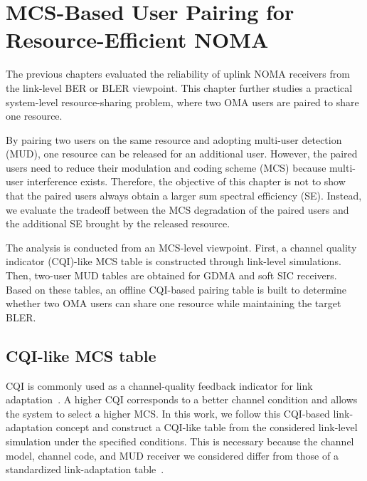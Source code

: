 
\chapter{MCS-Based User Pairing for Resource-Efficient NOMA}
\label{ch:cqi}

The previous chapters evaluated the reliability of uplink NOMA receivers from the link-level BER or BLER viewpoint. 
This chapter further studies a practical system-level resource-sharing problem, where two OMA users are paired to share one resource. 

By pairing two users on the same resource and adopting multi-user detection (MUD), one resource can be released for an additional user. However, the paired users need to reduce their modulation and coding scheme (MCS) because multi-user interference exists. 
Therefore, the objective of this chapter is not to show that the paired users always obtain a larger sum spectral efficiency (SE). Instead, we evaluate the tradeoff between the MCS degradation of the paired users and the additional SE brought by the released resource.

The analysis is conducted from an MCS-level viewpoint. First, a channel quality indicator (CQI)-like MCS table is constructed through link-level simulations. Then, two-user MUD tables are obtained for GDMA and soft SIC receivers. Based on these tables, an offline CQI-based pairing table is built to determine whether two OMA users can share one resource while maintaining the target BLER.


\section{CQI-like MCS table}
\label{sec:cqi-mcs-table}

CQI is commonly used as a channel-quality feedback indicator for link adaptation~\cite{gutierrez2020joint}. A higher CQI corresponds to a better channel condition and allows the system to select a higher MCS.
In this work, we follow this CQI-based link-adaptation concept and construct a CQI-like table from the considered link-level simulation under the specified conditions. This is necessary because the channel model, channel code, and MUD receiver we considered differ from those of a standardized link-adaptation table~\cite{etsi_ts_138_214_v18_2_0}.

